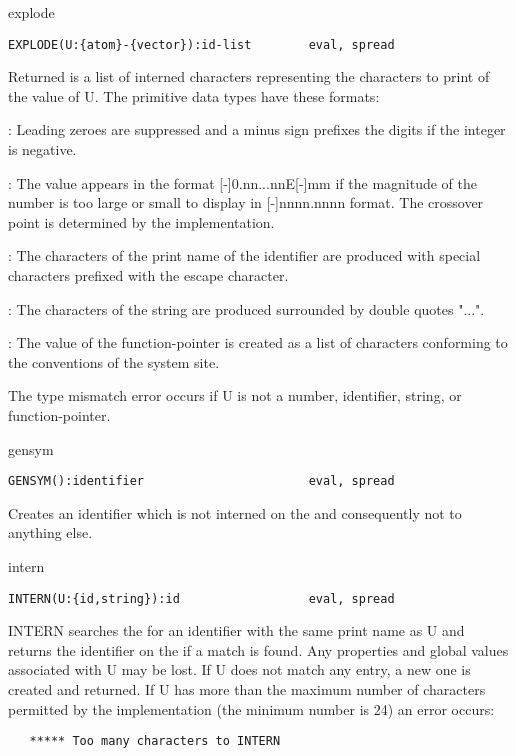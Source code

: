 \begin{Function}{explode}
\begin{verbatim}
EXPLODE(U:{atom}-{vector}):id-list        eval, spread
\end{verbatim}
   Returned  is a  list of  interned characters  representing the
   characters  to print  of the  value of  U. The  primitive data
   types have these formats:

   : Leading   zeroes  are  suppressed  and  a  minus  sign
         prefixes the digits if the integer is negative.

   : The  value appears  in the  format [-]0.nn...nnE[-]mm
         if the magnitude of the number  is too large or small to
         display in [-]nnnn.nnnn format.   The crossover point is
         determined by the implementation.

   : The   characters  of  the  print  name  of  the  identifier
         are produced with  special characters  prefixed with the
         escape character.

   : The  characters of  the string  are produced surrounded
         by double quotes "...".

   : The  value of the function-pointer is created
         as a list of characters conforming to the conventions of
         the system site.

   The  type  mismatch  error  occurs  if  U  is  not  a  number,
   identifier, string, or function-pointer.

\end{Function}
\begin{Function}{gensym}
\begin{verbatim}
GENSYM():identifier                       eval, spread
\end{verbatim}
   Creates  an identifier which is not interned on the  and
   consequently not  to anything else.

\end{Function}
\begin{Function}{intern}
\begin{verbatim}
INTERN(U:{id,string}):id                  eval, spread
\end{verbatim}
   INTERN  searches the   for  an identifier  with the same
   print  name as U and returns the identifier on the  if a
   match  is found.  Any  properties and global values associated
   with  U  may be  lost.    If U  does  not match  any  entry, a
   new  one is  created and  returned.   If  U has more  than the
   maximum  number of characters  permitted by the implementation
   (the minimum number is 24) an error occurs:
\begin{verbatim}
   ***** Too many characters to INTERN
\end{verbatim}
\end{Function}
